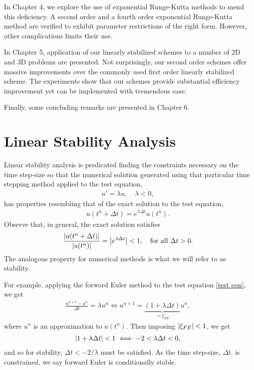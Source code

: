 In Chapter 4, we explore the use of exponential Runge-Kutta methods to mend this deficiency. A second order and a fourth order exponential Runge-Kutta method are verified to exhibit parameter restrictions of the right form. However, other complications limits their use.

In Chapter 5, application of our linearly stabilized schemes to a number of 2D and 3D problems are presented. Not surprisingly, our second order schemes offer massive improvements over the commonly used first order linearly stabilized scheme. The experiments show that our schemes provide substantial efficiency improvement yet can be implemented with tremendous ease. 

Finally, some concluding remarks are presented in Chapter 6.  


\section{Linear Stability Analysis}
Linear stability analysis is predicated finding the constraints necessary on the time step-size so that the numerical solution generated using that particular time stepping method applied to the test equation, 
\begin{align}
u' = \lambda u, 
\quad \lambda < 0,
\label{test eqn}
\end{align}  
has properties resembling that of the exact solution to the test equation,
\begin{align}
u(t^n + \Delta t) = e^{\lambda \Delta t} u(t^n).
\end{align}
Observe that, in general, the exact solution satisfies
\begin{align}
\frac{\left|u(t^n + \Delta t)\right|}{\left|u(t^n)\right|}
= \left|e^{\lambda\Delta t} \right| 
< 1,
\quad\text{for all } \Delta t > 0.
\end{align}
The analogous property for numerical methods is what we will refer to as stability.

For example, applying the forward Euler method to the test equation \cref{test eqn}, we get 
\begin{align}
\frac{u^{n+1} - u^n}{\Delta t} = \lambda u^n 
\iff u^{n+1} = \underbrace{(1 + \lambda \Delta t)}_{=\xi_{FE}} u^n, 
\end{align}
where $u^n$ is an approximation to $u(t^n)$. Then imposing $\left|\xi_{FE}\right| < 1$, we get 
\begin{align}
\left|1+ \lambda\Delta t\right| < 1 
\iff -2 < \lambda\Delta t < 0,
\end{align}
and so for stability, $\Delta t < -2/\lambda$ must be satisfied. As the time step-size, $\Delta t$, is constrained, we say forward Euler is conditionally stable. 

